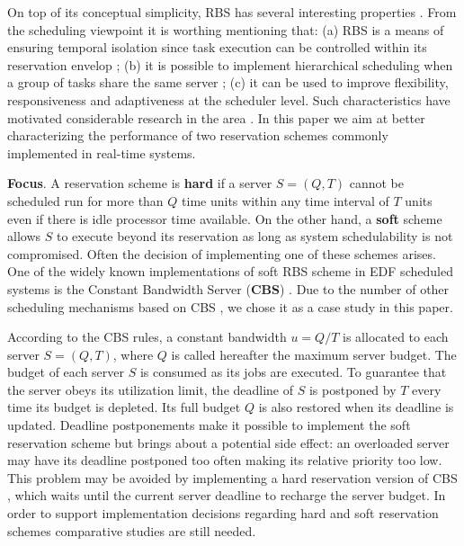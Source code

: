 \documentclass[times, 10pt,twocolumn]{article}
\begin{document}
On top of its conceptual simplicity, RBS has several interesting
properties \cite{steffens.ea03:resource}. From the scheduling
viewpoint it is worthing mentioning that: (a) RBS is a means of
ensuring temporal isolation since task execution can be controlled
within its reservation envelop
\cite{abeni.ea04:resource,mercer.ea94:processor,sprunt.ea89:aperiodic,spuri.ea96:scheduling};
(b) it is possible to implement hierarchical scheduling when a group
of tasks share the same server
\cite{davis.ea05:hierarchical,davis.ea08:investigation}; (c) it can be
used to improve flexibility, responsiveness and adaptiveness at the
scheduler level.  Such characteristics have motivated considerable
research in the area
\cite{abeni.ea99:adaptive,caccamo.ea00:capacity,caccamo.ea05:efficient,oliveira.ea08:dynamic,oliveira.ea09:dynamic,lin.ea05:improving}.
In this paper we aim at better characterizing the performance of two
reservation schemes commonly implemented in real-time systems.

\textbf{Focus}.  A reservation scheme is \textbf{hard} if a server
$S = (Q,T)$ cannot be scheduled run for more than $Q$ time
units within any time interval of $T$ units even if there is idle
processor time available. On the other hand, a \textbf{soft} scheme
allows $S$ to execute beyond its reservation as long as system
schedulability is not compromised. Often the decision of implementing
one of these schemes arises. One of the widely known implementations
of soft RBS scheme in EDF scheduled systems is the Constant Bandwidth
Server (\textbf{CBS}) \cite{abeni.ea04:resource}.  Due to the number
of other scheduling mechanisms based on CBS
\cite{abeni.ea05:qos,caccamo.ea00:capacity,caccamo.ea05:efficient,lipari.ea00:greedy},
we chose it as a case study in this paper.

According to the CBS rules, a constant bandwidth $u = Q/T$ is
allocated to each server $S = (Q,T)$, where $Q$ is called hereafter
the maximum server budget. The budget of each server $S$ is consumed
as its jobs are executed. To guarantee that the server obeys its
utilization limit, the deadline of $S$ is postponed by $T$ every time
its budget is depleted.  Its full budget $Q$ is also restored when its
deadline is updated.  Deadline postponements make it possible to
implement the soft reservation scheme but brings about a potential
side effect: an overloaded server may have its deadline postponed too
often making its relative priority too low.  This problem may be
avoided by implementing a hard reservation version of CBS
\cite{buttazzo05:soft}, which waits until the current server deadline
to recharge the server budget. In order to support implementation
decisions regarding hard and soft reservation schemes comparative
studies are still needed.
\end{document}
